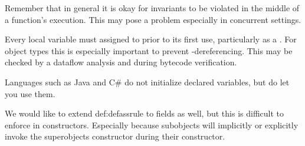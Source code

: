 \documentclass{article}
\begin{document}
Remember that in general it is okay for invariants to be violated in the middle of a function's execution.
This may pose a problem especially in concurrent settings.

\begin{definition}
  \label{def:defassrule}
  Every local variable must assigned to prior to its first use, particularly as a \receiver{}.
  For object types this is especially important to prevent \cringe{}-dereferencing.
  This may be checked by a dataflow analysis and during bytecode verification.
\end{definition}

\begin{remark}
  Languages such as Java and C\# do not initialize declared variables, but do let you use them.
\end{remark}

We would like to extend {def:defassrule} to fields as well, but this is difficult to enforce in constructors.
Especially because subobjects will implicitly or explicitly invoke the superobjects constructor during their constructor.
\end{document}
